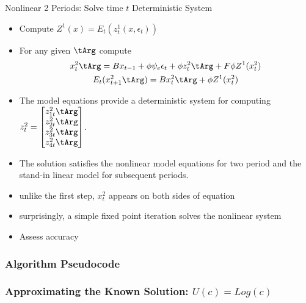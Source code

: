\documentclass[12pt]{article}
\begin{document}



  {Nonlinear 2 Periods: Solve time $t$ Deterministic
    System }
{\small
  \begin{itemize}
  \item Compute $Z^1(x)= E_t(z^1_t(x,\epsilon_t))$
  \item For any given $\tArg$ 
compute
{\small
  \begin{gather}
    x_t^2\tArg=B x_{t-1} + \phi \psi_e\epsilon_t + \phi z^2_t\tArg + F \phi Z^1(x^2_t) \label{bothS}\\
    E_t(x^2_{t+1}\tArg)=B x^2_{t}\tArg+ \phi Z^1(x^2_t)
  \end{gather}
}
\item The model equations provide a deterministic system  for computing $  z^2_t=\begin{bmatrix}
    z^2_{1t}\tArg\\
    z^2_{2t}\tArg\\
    z^2_{3t}\tArg\\
    z^2_{4t}\tArg
  \end{bmatrix}$.
\item The solution satisfies the nonlinear model equations for two 
period and the stand-in linear model for subsequent periods.
\item unlike the first step, $x^2_t$ appears on both sides of equation 
\item  surprisingly, a simple fixed point iteration solves the nonlinear system
\item Assess accuracy
  \end{itemize}
}

\subsubsection{Algorithm Pseudocode}
\label{sec:pseudocode}


\subsubsection{Approximating the Known Solution: $U(c) = Log(c)$ }
\label{sec:recov-known-solut}
\end{document}
